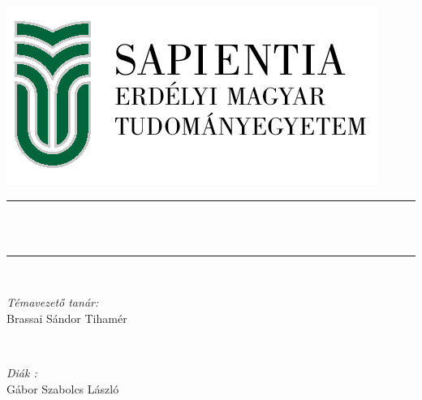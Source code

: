 \begin{titlepage}
	

	\centering
    \vspace*{4 cm}
    \includegraphics[scale=0.65]{Fedolap/SapientiaLogo1.png}\\
    [1.0 cm]	%

	\rule{\linewidth}{0.2 mm} \\[0.4 cm]
	\centering
	{ \huge \bfseries \thetitle}\\
	\rule{\linewidth}{0.2 mm} \\[1.5 cm]
	
	\vspace*{4 cm}
	
	\begin{minipage}{0.4\textwidth}
		\begin{flushleft} \large
			\emph{Témavezető tanár:}\\
			Brassai Sándor Tihamér\\
			\end{flushleft}
			\end{minipage}~
			\begin{minipage}{0.4\textwidth}
            
			\begin{flushright} \large
			\emph{Diák :} \\
			Gábor Szabolcs László\\
		\end{flushright}
        
	\end{minipage}\\[2 cm]
\end{titlepage}
	